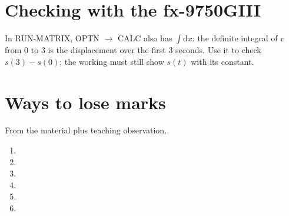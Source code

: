 \documentclass[11pt]{article}
\begin{document}
\section{Checking with the fx-9750GIII}\label{calc}
In \textsf{RUN-MATRIX}, \textsf{OPTN} $\to$ \textsf{CALC} also has $\int\mathrm{d}x$:
the definite integral of $v$ from $0$ to $3$ is the displacement over the first $3$ seconds.
Use it to check $s(3)-s(0)$; the working must still show $s(t)$ with its constant.

\section{Ways to lose marks}\label{lose}
From the material plus teaching observation.
\begin{enumerate}[leftmargin=7mm, itemsep=2pt]
\item[\textbf{\lmnum{plusc}}] 
\item[\textbf{\lmnum{newpower}}] 
\item[\textbf{\lmnum{value}}] 
\item[\textbf{\lmnum{meaning}}] 
\item[\textbf{\lmnum{wrongzero}}] 
\item[\textbf{\lmnum{distance}}] 
\end{enumerate}
\end{document}
